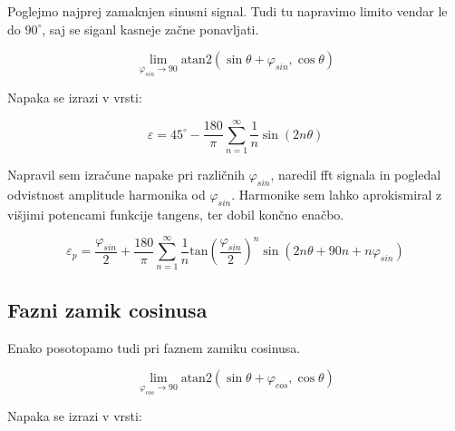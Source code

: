 Poglejmo najprej zamaknjen sinusni signal. Tudi tu napravimo limito vendar le do $90^\circ$, saj se siganl kasneje začne ponavljati.



\begin{equation}
\lim_{\varphi_{sin} \rightarrow 90} \mathrm{atan2}(\sin{\theta+\varphi_{sin}} ,\cos{\theta}) 
\end{equation}



Napaka se izrazi v vrsti:

\begin{equation}
\varepsilon = 45^\circ - \frac{180}{\pi}\sum_{n=1}^{\infty}\frac{1}{n} \sin (2n \theta)
\end{equation}


Napravil sem izračune napake pri različnih $\varphi_{sin}$, naredil fft signala in pogledal odvistnost amplitude harmonika od $\varphi_{sin}$. Harmonike sem lahko aprokismiral z višjimi potencami funkcije tangens, ter dobil končno enačbo.


\begin{equation}
\label{vrsta_faza_sin}
\varepsilon_p = \frac{\varphi_{sin}}{2} + \frac{180}{\pi}\sum_{n=1}^{\infty}\frac{1}{n} \mathrm{tan}(\frac{\varphi_{sin}}{2})^n \sin (2n \theta+90 n +n \varphi_{sin})
\end{equation}




\subsection{Fazni zamik cosinusa}

Enako posotopamo tudi pri faznem zamiku cosinusa.



\begin{equation}
\lim_{\varphi_{cos} \rightarrow 90} \mathrm{atan2}(\sin{\theta+\varphi_{cos}} ,\cos{\theta}) 
\end{equation}



Napaka se izrazi v vrsti:


